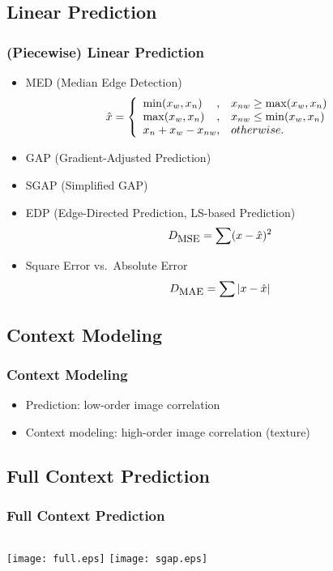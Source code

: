 \documentclass[slidestop,compress]{beamer}
\begin{document}
\subsection{Linear Prediction}
\begin{frame}
\frametitle{(Piecewise) Linear Prediction}
    \begin{itemize}
	\item MED (Median Edge Detection)
	  \begin{equation}\label{eqn:med1}
	    \hat{x} = \left\{ \begin{array}{l@{,\quad}l}
		\min(x_w,x_n) 	& x_{nw} \ge \max(x_w,x_n) \\
		\max(x_w,x_n) 	& x_{nw} \le \min(x_w,x_n) \\
		x_n + x_w - x_{nw} 	& otherwise.
	  \end{array} \right. 
	  \end{equation}  
	\item GAP (Gradient-Adjusted Prediction)
	\item SGAP (Simplified GAP)
	\item EDP (Edge-Directed Prediction, LS-based Prediction)
	    \begin{equation*}
		D_{\mbox{\small{MSE}}} = \sum (x - \hat{x})^2
	    \end{equation*}
	\item Square Error vs.\ Absolute Error
	    \begin{equation*}
		D_{\mbox{\small{MAE}}} = \sum |x - \hat{x}|
	    \end{equation*}
    \end{itemize}
\end{frame}

\subsection{Context Modeling}
\begin{frame}
\frametitle{Context Modeling}
    \begin{itemize}
	\item Prediction: low-order image correlation  
	\item Context modeling: high-order image correlation (texture)
    \end{itemize}
\end{frame}

\subsection{Full Context Prediction}
\begin{frame}
\frametitle{Full Context Prediction}
    \vspace{0.8cm}
    \begin{columns}[c]
	    \texttt{[image: full.eps]}
	    \texttt{[image: sgap.eps]}
    \end{columns}
\end{frame}
\end{document}
